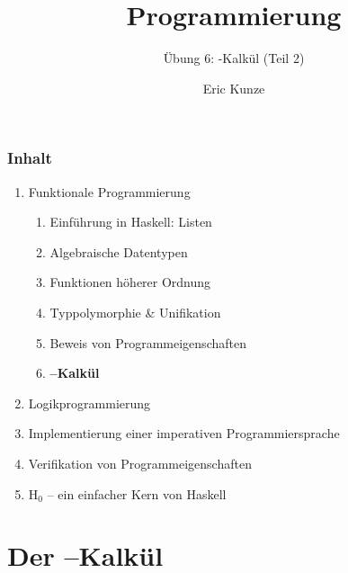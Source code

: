 \documentclass{beamer}
\begin{document}
	
	\title{Programmierung}
	\subtitle{Übung 6: \textlambda-Kalkül (Teil 2)}
	\author{Eric Kunze}
	\date{}
	
	\maketitle
	


\begin{frame}[fragile] \frametitle{Inhalt}
	\begin{enumerate}
		\item Funktionale Programmierung
		\begin{enumerate}
			\item Einführung in Haskell: Listen
			\item Algebraische Datentypen
			\item Funktionen höherer Ordnung
			\item Typpolymorphie \& Unifikation
			\item Beweis von Programmeigenschaften
			\item \textbf{\textlambda--Kalkül}
		\end{enumerate}
		\item Logikprogrammierung
		\item Implementierung einer imperativen Programmiersprache
		\item Verifikation von Programmeigenschaften
		\item H${}_\text{0}$ -- ein einfacher Kern von Haskell
	\end{enumerate}
\end{frame}


\section{Der \textlambda--Kalkül}
\end{document}
